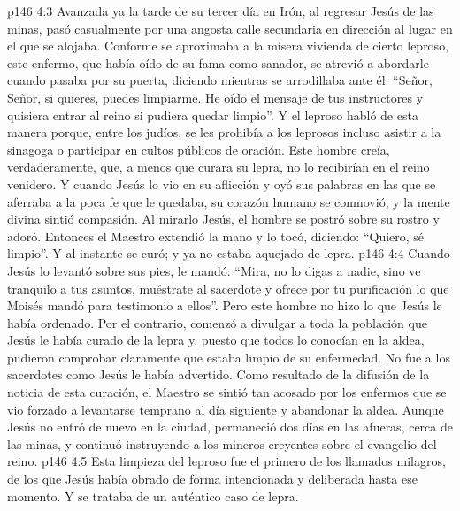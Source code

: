 \vs p146 4:3 \pc Avanzada ya la tarde de su tercer día en Irón, al regresar Jesús de las minas, pasó casualmente por una angosta calle secundaria en dirección al lugar en el que se alojaba. Conforme se aproximaba a la mísera vivienda de cierto leproso, este enfermo, que había oído de su fama como sanador, se atrevió a abordarle cuando pasaba por su puerta, diciendo mientras se arrodillaba ante él: “Señor, Señor, si quieres, puedes limpiarme. He oído el mensaje de tus instructores y quisiera entrar al reino si pudiera quedar limpio”. Y el leproso habló de esta manera porque, entre los judíos, se les prohibía a los leprosos incluso asistir a la sinagoga o participar en cultos públicos de oración. Este hombre creía, verdaderamente, que, a menos que curara su lepra, no lo recibirían en el reino venidero. Y cuando Jesús lo vio en su aflicción y oyó sus palabras en las que se aferraba a la poca fe que le quedaba, su corazón humano se conmovió, y la mente divina sintió compasión. Al mirarlo Jesús, el hombre se postró sobre su rostro y adoró. Entonces el Maestro extendió la mano y lo tocó, diciendo: “Quiero, sé limpio”. Y al instante se curó; y ya no estaba aquejado de lepra.
\vs p146 4:4 Cuando Jesús lo levantó sobre sus pies, le mandó: “Mira, no lo digas a nadie, sino ve tranquilo a tus asuntos, muéstrate al sacerdote y ofrece por tu purificación lo que Moisés mandó para testimonio a ellos”. Pero este hombre no hizo lo que Jesús le había ordenado. Por el contrario, comenzó a divulgar a toda la población que Jesús le había curado de la lepra y, puesto que todos lo conocían en la aldea, pudieron comprobar claramente que estaba limpio de su enfermedad. No fue a los sacerdotes como Jesús le había advertido. Como resultado de la difusión de la noticia de esta curación, el Maestro se sintió tan acosado por los enfermos que se vio forzado a levantarse temprano al día siguiente y abandonar la aldea. Aunque Jesús no entró de nuevo en la ciudad, permaneció dos días en las afueras, cerca de las minas, y continuó instruyendo a los mineros creyentes sobre el evangelio del reino.
\vs p146 4:5 Esta limpieza del leproso fue el primero de los llamados milagros, de los que Jesús había obrado de forma intencionada y deliberada hasta ese momento. Y se trataba de un auténtico caso de lepra.
